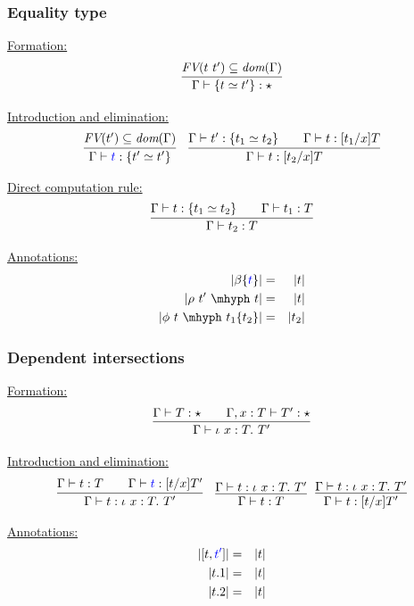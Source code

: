 \documentclass[11pt]{beamer}
\begin{document}
\begin{frame}
  \frametitle{Equality type}

  \underline{Formation:}
  \[
  \infer{\Gamma \vdash \{ t \simeq t' \} : \star}{\textit{FV}(t\ t')\subseteq\textit{dom}(\Gamma)}
  \]

  \underline{Introduction and elimination:}
  \[
  \begin{array}{ll}
    \infer{\Gamma\vdash \textcolor{blue}{t} : \{ t' \simeq t'\}}{\textit{FV}(t')\subseteq\textit{dom}(\Gamma)}
    &
    \infer{\Gamma\vdash t : [t_2/x]T}{\Gamma\vdash t' : \{ t_1\simeq t_2\} \qquad \Gamma\vdash t : [t_1/x]T}
  \end{array}
  \]

  \underline{Direct computation rule:}
  \[
  \infer{\Gamma\vdash t_2 : T}{\Gamma\vdash t : \{ t_1 \simeq t_2\} \qquad \Gamma\vdash t_1 : T}
  \]

  \underline{Annotations:}
  \begin{eqnarray*}
    |\beta\{\textcolor{blue}{t}\}| & = & |t| \\
    |\rho\ t'\ \mhyph\ t| & = & |t| \\
    |\phi\ t\ \mhyph\ t_1\{t_2\}| & = & |t_2|
  \end{eqnarray*}

  \vspace{.1cm}

\pause

  {\color{purple}
    \large
    }

\vspace{-3.5cm}

\hspace{2.2cm}  
  
\end{frame}  

\begin{frame}
  \frametitle{Dependent intersections}

  \underline{Formation:}
  \[
  \infer{\Gamma\vdash \iota\ x:T.\ T'}{\Gamma\vdash T:\star \qquad \Gamma,x:T\vdash T':\star}
  \]

  \underline{Introduction and elimination:}
  \[
  \begin{array}{ll}
  \infer{\Gamma\vdash t : \iota\ x:T.\ T'}{\Gamma\vdash t : T \qquad \Gamma\vdash \textcolor{blue}{t} : [t/x]T'}
  &
  \infer{\Gamma\vdash t : T}{\Gamma\vdash t : \iota\ x:T.\ T'} \ \
  \infer{\Gamma\vdash t : [t/x]T'}{\Gamma\vdash t : \iota\ x:T.\ T'}
  \end{array}
  \]

  \underline{Annotations:}
  \begin{eqnarray*}
    |[t,\textcolor{blue}{t'}]| & = & |t| \\
    |t.1| & = & |t| \\
    |t.2| & = & |t|
  \end{eqnarray*}
\end{frame}
\end{document}
